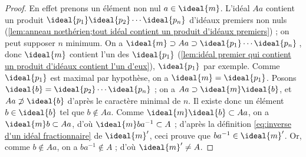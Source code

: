\documentclass[11pt, useosf,
  title in boldface,
  theorem in new line,
  theorem numbering = section,
  number theorems separately,
]{simplivre}
\begin{document}
\begin{proof}
        En effet prenons un élément non nul \( a \in \ideal{m} \). L'idéal \( Aa \) contient un produit \( \ideal{p_1} \ideal{p_2} \cdots \ideal{p_n} \) d'idéaux premiers non nuls (\cref{lem:anneau nœthérien;tout idéal contient un produit d'idéaux premiers}) ; on peut supposer \( n \) minimum. On a \( \ideal{m} \supset Aa \supset \ideal{p_1} \cdots \ideal{p_n} \)\,, donc \( \ideal{m} \) contient l'un des \( \ideal{p_1} \) (\cref{lem:idéal premier qui contient un produit d'idéaux contient l'un d'eux}), \( \ideal{p_1} \) par exemple. Comme \( \ideal{p_1} \) est maximal par hypothèse, on a \( \ideal{m} = \ideal{p_1} \). Posons \( \ideal{b} = \ideal{p_2} \cdots \ideal{p_n} \) ; on a \( Aa \supset \ideal{m}\ideal{b} \), et \( Aa \not\supset \ideal{b} \) d'après le caractère minimal de \( n \). Il existe donc un élément \( b \in \ideal{b} \) tel que \( b \notin Aa \). Comme \( \ideal{m}\ideal{b} \subset Aa \), on a \( \ideal{m} b \subset Aa \), d'où \( \ideal{m} b a^{-1} \subset A \) ; d'après la définition \eqref{eq:inverse d'un idéal fractionnaire} de \( \ideal{m}' \), ceci prouve que \( ba^{-1} \in \ideal{m}' \). Or, comme \( b \notin Aa \), on a \( ba^{-1} \notin A \) ; d'où \( \ideal{m}' \neq A \).
    \end{proof}
\end{document}
